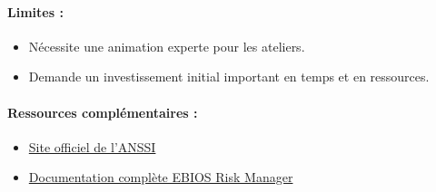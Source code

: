 \documentclass[french, 12pt]{article}%
\newcommand{\itemE}{\item[$\bullet$]}
\begin{document}
\paragraph{Limites :}
\begin{itemize}
    \itemE Nécessite une animation experte pour les ateliers.
    \itemE Demande un investissement initial important en temps et en ressources.
\end{itemize}


\paragraph{Ressources complémentaires :}
\begin{itemize}
    \itemE \href{https://www.ssi.gouv.fr}{Site officiel de l'ANSSI}
    \itemE \href{https://www.ssi.gouv.fr/guide-ebios-risk-manager/}{Documentation complète EBIOS Risk Manager}
\end{itemize}
\end{document}
